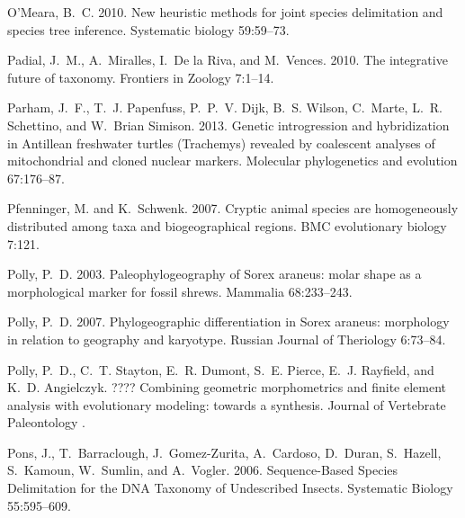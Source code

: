 \documentclass[12pt,letterpaper]{article}
\begin{document}
\begin{thebibliography}{77}
    O'Meara, B.~C. 2010. {New heuristic methods for joint species delimitation and
    species tree inference.} Systematic biology 59:59--73.

    Padial, J.~M., A.~Miralles, I.~{De la Riva}, and M.~Vences. 2010. {The
    integrative future of taxonomy}. Frontiers in Zoology 7:1--14.

    Parham, J.~F., T.~J. Papenfuss, P.~P.~V. Dijk, B.~S. Wilson, C.~Marte, L.~R.
    Schettino, and W.~{Brian Simison}. 2013. {Genetic introgression and
      hybridization in Antillean freshwater turtles (Trachemys) revealed by
    coalescent analyses of mitochondrial and cloned nuclear markers.} Molecular
    phylogenetics and evolution 67:176--87.

    Pfenninger, M. and K.~Schwenk. 2007. {Cryptic animal species are homogeneously
    distributed among taxa and biogeographical regions.} BMC evolutionary biology
    7:121.

    Polly, P.~D. 2003. {Paleophylogeography of Sorex araneus: molar shape as a
    morphological marker for fossil shrews}. Mammalia 68:233--243.

    Polly, P.~D. 2007. {Phylogeographic differentiation in Sorex araneus:
    morphology in relation to geography and karyotype}. Russian Journal of
    Theriology 6:73--84.

    Polly, P.~D., C.~T. Stayton, E.~R. Dumont, S.~E. Pierce, E.~J. Rayfield, and
    K.~D. Angielczyk. ???? {Combining geometric morphometrics and finite element
    analysis with evolutionary modeling: towards a synthesis}. Journal of
    Vertebrate Paleontology .

    Pons, J., T.~Barraclough, J.~Gomez-Zurita, A.~Cardoso, D.~Duran, S.~Hazell,
    S.~Kamoun, W.~Sumlin, and A.~Vogler. 2006. {Sequence-Based Species
    Delimitation for the DNA Taxonomy of Undescribed Insects}. Systematic Biology
    55:595--609.


\end{thebibliography}
\end{document}
